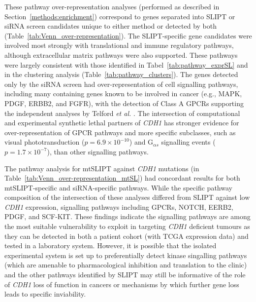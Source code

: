 These pathway over-representation analyses (performed as described in Section~\ref{methods:enrichment}) correspond to genes separated into SLIPT or siRNA screen candidates unique to either method or detected by both (Table~\ref{tab:Venn_over-representation}). The SLIPT-specific gene candidates were involved most strongly with translational and immune regulatory pathways, although extracellular matrix pathways were also supported. These pathways were largely consistent with those identified in Tabel~\ref{tab:pathway_exprSL} and in the clustering analysis (Table~\ref{tab:pathway_clusters}). The genes detected only by the siRNA screen had over-represent\-ation of cell signalling pathways, including many containing genes known to be involved in cancer (e.g., MAPK, PDGF, ERBB2, and FGFR), with the detection of Class A GPCRs supporting the independent analyses by  Telford \textit{et al.} \cite{Telford2015}. The intersection of computational and experimental synthetic lethal partners of \textit{CDH1} has stronger evidence for over-represent\-ation of GPCR pathways and more specific subclasses, such as visual phototransduction ($p=6.9 \times 10^{-10}$) and G$_{\alpha s}$ signalling events ($p=1.7 \times 10^{-7}$), than other signalling pathways.

The pathway analysis for mtSLIPT against \textit{CDH1} mutations (in Table~\ref{tab:Venn_over-representation_mtSL}) had concordant results for both mtSLIPT-specific and siRNA-specific pathways. While the specific pathway composition of the intersection of these analyses differed from SLIPT against low \textit{CDH1} expression, signalling pathways including GPCRs, NOTCH, EERB2, PDGF, and SCF-KIT. These findings indicate the signalling pathways are among the most suitable vulnerability to exploit in targeting \textit{CDH1} deficient tumours as they can be detected in both a patient cohort (with TCGA expression data) and tested in a laboratory system. However, it is possible that the isolated experimental system is set up to preferentially detect kinase singalling pathways (which are amenable to pharmacological inhibition and translation to the clinic) and the other pathways identified by SLIPT may still be informative of the role of \textit{CDH1} loss of function in cancers or mechanisms by which further gene loss leads to specific inviability.



\FloatBarrier

 \label{chapt3:compare_pathway_perm}

